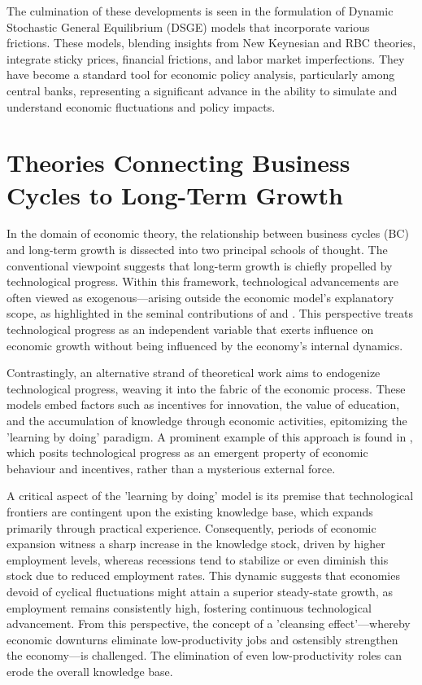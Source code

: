 \documentclass[12pt]{article}
\begin{document}
The culmination of these developments is seen in the formulation of Dynamic Stochastic General Equilibrium (DSGE) models
that incorporate various frictions. These models, blending insights from New Keynesian and RBC theories, integrate
sticky prices, financial frictions, and labor market imperfections. They have become a standard tool for economic policy
analysis, particularly among central banks, representing a significant advance in the ability to simulate and understand
economic fluctuations and policy impacts. 

\section{Theories Connecting Business Cycles to Long-Term Growth}

In the domain of economic theory, the relationship between business cycles (BC) and long-term growth is dissected into
two principal schools of thought. The conventional viewpoint suggests that long-term growth is chiefly propelled by
technological progress. Within this framework, technological advancements are often viewed as exogenous—arising outside
the economic model's explanatory scope, as highlighted in the seminal contributions of \cite{Sol56} and \cite{Swa56}.
This perspective treats technological progress as an independent variable that exerts influence on economic growth
without being influenced by the economy's internal dynamics. 

Contrastingly, an alternative strand of theoretical work aims to endogenize technological progress, weaving it into the
fabric of the economic process. These models embed factors such as incentives for innovation, the value of education,
and the accumulation of knowledge through economic activities, epitomizing the 'learning by doing' paradigm. A prominent
example of this approach is found in \cite{Sta90}, which posits technological progress as an emergent property of
economic behaviour and incentives, rather than a mysterious external force. 

A critical aspect of the 'learning by doing' model is its premise that technological frontiers are contingent upon the
existing knowledge base, which expands primarily through practical experience. Consequently, periods of economic
expansion witness a sharp increase in the knowledge stock, driven by higher employment levels, whereas recessions tend
to stabilize or even diminish this stock due to reduced employment rates. This dynamic suggests that economies devoid of
cyclical fluctuations might attain a superior steady-state growth, as employment remains consistently high, fostering
continuous technological advancement. From this perspective, the concept of a 'cleansing effect'—whereby economic
downturns eliminate low-productivity jobs and ostensibly strengthen the economy—is challenged. The elimination of even
low-productivity roles can erode the overall knowledge base. 
\end{document}
